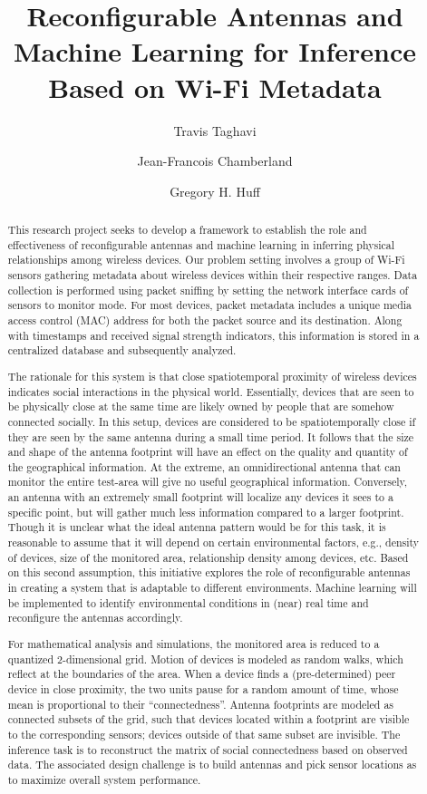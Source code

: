 \documentclass{ursiNRSM}
\title{Reconfigurable Antennas and Machine Learning for Inference Based on Wi-Fi Metadata}
\author[org1]{Travis Taghavi}
\author[org1]{Jean-Francois Chamberland}
\author[org1]{Gregory H. Huff}
\begin{document}
\begin{abstract}

This research project seeks to develop a framework to establish the role and effectiveness of reconfigurable antennas and machine learning in inferring physical relationships among wireless devices.
Our problem setting involves a group of Wi-Fi sensors gathering metadata about wireless devices within their respective ranges.
Data collection is performed using packet sniffing by setting the network interface cards of sensors to monitor mode.
For most devices, packet metadata includes a unique media access control (MAC) address for both the packet source and its destination.
Along with timestamps and received signal strength indicators, this information is stored in a centralized database and subsequently analyzed.

The rationale for this system is that close spatiotemporal proximity of wireless devices indicates social interactions in the physical world.
Essentially, devices that are seen to be physically close at the same time are likely owned by people that are somehow connected socially.
In this setup, devices are considered to be spatiotemporally close if they are seen by the same antenna during a small time period.
It follows that the size and shape of the antenna footprint will have an effect on the quality and quantity of the geographical information.
At the extreme, an omnidirectional antenna that can monitor the entire test-area will give no useful geographical information.
Conversely, an antenna with an extremely small footprint will localize any devices it sees to a specific point, but will gather much less information compared to a larger footprint.
Though it is unclear what the ideal antenna pattern would be for this task, it is reasonable to assume that it will depend on certain environmental factors, e.g., density of devices, size of the monitored area, relationship density among devices, etc.
Based on this second assumption, this initiative explores the role of reconfigurable antennas in creating a system that is adaptable to different environments.
Machine learning will be implemented to identify environmental conditions in (near) real time and reconfigure the antennas accordingly.

For mathematical analysis and simulations, the monitored area is reduced to a quantized 2-dimensional grid.
Motion of devices is modeled as random walks, which reflect at the boundaries of the area.
When a device finds a (pre-determined) peer device in close proximity, the two units pause for a random amount of time, whose mean is proportional to their ``connectedness''.
Antenna footprints are modeled as connected subsets of the grid, such that devices located within a footprint are visible to the corresponding sensors; devices outside of that same subset are invisible.
The inference task is to reconstruct the matrix of social connectedness based on observed data.
The associated design challenge is to build antennas and pick sensor locations as to maximize overall system performance.

\end{abstract}
\end{document}

